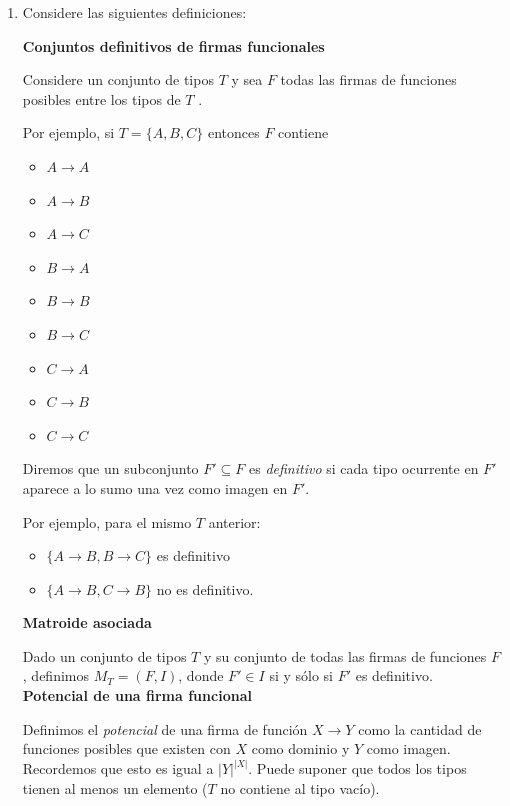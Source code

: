 \documentclass[letterpaper, 12pt]{article}
\begin{document}
\begin{enumerate}


\item Considere las siguientes definiciones:

\textbf{Conjuntos definitivos de firmas funcionales}

Considere un conjunto de tipos $T$ y sea $F$ todas las firmas de funciones posibles entre los tipos de $T$ .

Por ejemplo, si $T = \{A, B, C\}$ entonces $F$ contiene

\begin{multicols}{3}
\begin{itemize}
    \item $A \rightarrow A$
    \item $A \rightarrow B$
    \item $A \rightarrow C$
    \item $B \rightarrow A$
    \item $B \rightarrow B$
    \item $B \rightarrow C$
    \item $C \rightarrow A$
    \item $C \rightarrow B$
    \item $C \rightarrow C$
\end{itemize}
\end{multicols}

Diremos que un subconjunto $F' \subseteq F$ es \emph{definitivo} si cada tipo ocurrente en $F'$ aparece a lo sumo una vez como imagen en $F'$.

Por ejemplo, para el mismo $T$ anterior:

\begin{itemize}
    \item $\{A \rightarrow B, B \rightarrow C\}$ es definitivo
    \item $\{A \rightarrow B, C \rightarrow B\}$ no es definitivo.
\end{itemize}

\textbf{Matroide asociada}

Dado un conjunto de tipos $T$ y su conjunto de todas las firmas de funciones $F$, definimos $M_T = (F, I)$, donde $F' \in I$ si y sólo si $F'$ es definitivo. \\

\textbf{Potencial de una firma funcional}

Definimos el \emph{potencial} de una firma de función $X \rightarrow Y$ como la cantidad de funciones posibles que existen con $X$ como dominio y $Y$ como imagen. Recordemos que esto es igual a $|Y|^{|X|}$. Puede suponer que todos los tipos tienen al menos un elemento ($T$ no contiene al tipo vacío).


\end{enumerate}
\end{document}
